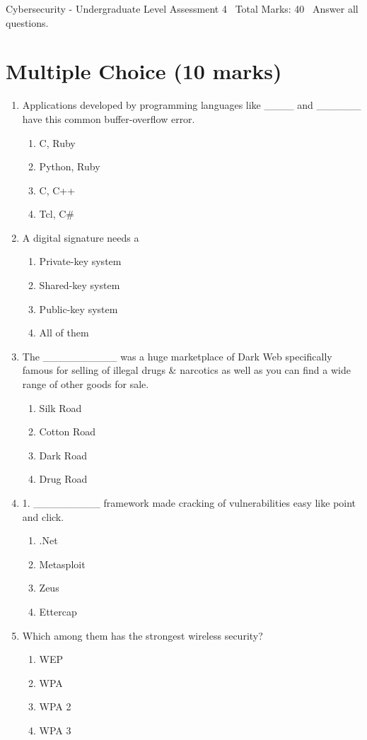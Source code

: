 \documentclass[12pt]{article}
\begin{document}
\begin{center}
Cybersecurity - Undergraduate Level Assessment 4 \
Total Marks: 40 \
Answer all questions.
\end{center}

\section*{Multiple Choice (10 marks)}
\begin{enumerate}[label=\arabic*.]
\item Applications developed by programming languages like \_\_\_\_ and \_\_\_\_\_\_ have this common buffer-overflow error.
\begin{enumerate}[label=(\alph*)]
    \item C, Ruby
    \item Python, Ruby
    \item C, C++
    \item Tcl, C\#
\end{enumerate}
\item A digital signature needs a
\begin{enumerate}[label=(\alph*)]
    \item Private-key system
    \item Shared-key system
    \item Public-key system
    \item All of them
\end{enumerate}
\item The \_\_\_\_\_\_\_\_\_\_ was a huge marketplace of Dark Web specifically famous for selling of illegal drugs \& narcotics as well as you can find a wide range of other goods for sale.
\begin{enumerate}[label=(\alph*)]
    \item Silk Road
    \item Cotton Road
    \item Dark Road
    \item Drug Road
\end{enumerate}
\item 1. \_\_\_\_\_\_\_\_\_ framework made cracking of vulnerabilities easy like point and click.
\begin{enumerate}[label=(\alph*)]
    \item .Net
    \item Metasploit
    \item Zeus
    \item Ettercap
\end{enumerate}
\item Which among them has the strongest wireless security?
\begin{enumerate}[label=(\alph*)]
    \item WEP
    \item WPA
    \item WPA 2
    \item WPA 3
\end{enumerate}
\end{enumerate}
\end{document}
